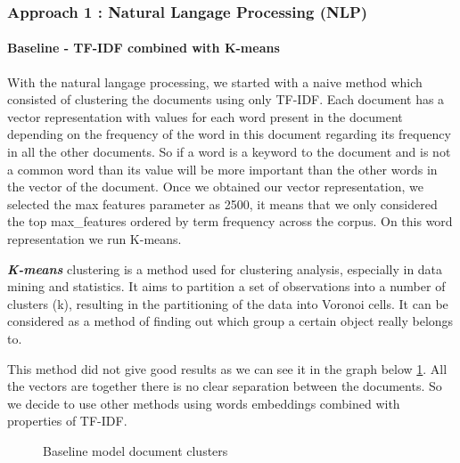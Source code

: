 \documentclass[article,twocolumn]{IEEEtran}
\begin{document}
\hypertarget{approach-1-natural-langage-processing-nlp}{%
\subsubsection{Approach 1 : Natural Langage Processing
(NLP)}\label{approach-1-natural-langage-processing-nlp}}

\hypertarget{baseline---tf-idf-combined-with-k-means}{%
\paragraph{Baseline - TF-IDF combined with
K-means}\label{baseline---tf-idf-combined-with-k-means}}

With the natural langage processing, we started with a naive method
which consisted of clustering the documents using only TF-IDF. Each
document has a vector representation with values for each word present
in the document depending on the frequency of the word in this document
regarding its frequency in all the other documents. So if a word is a
keyword to the document and is not a common word than its value will be
more important than the other words in the vector of the document. Once
we obtained our vector representation, we selected the max features
parameter as 2500, it means that we only considered the top
max\_features ordered by term frequency across the corpus. On this word
representation we run K-means.

\textbf{\emph{K-means}} clustering is a method used for clustering
analysis, especially in data mining and statistics. It aims to partition
a set of observations into a number of clusters (k), resulting in the
partitioning of the data into Voronoi cells. It can be considered as a
method of finding out which group a certain object really belongs to.

This method did not give good results as we can see it in the graph
below \ref{fig3}. All the vectors are together there is no clear
separation between the documents. So we decide to use other methods
using words embeddings combined with properties of TF-IDF.


    \begin{figure}
        \begin{center}\end{center}
        \caption{Baseline model document clusters}
        \label{fig3}
    \end{figure}
    
\end{document}
